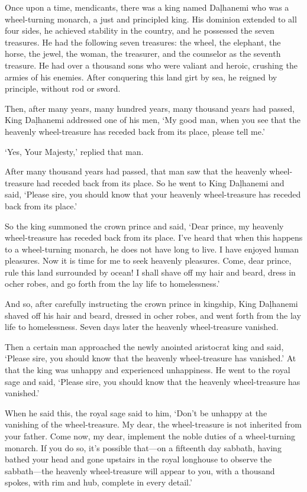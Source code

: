 \documentclass[12pt,openany]{book}%
\begin{document}
Once upon a time, mendicants, there was a king named \textsanskrit{Daḷhanemi} who was a wheel-turning monarch, a just and principled king. His dominion extended to all four sides, he achieved stability in the country, and he possessed the seven treasures. He had the following seven treasures: the wheel, the elephant, the horse, the jewel, the woman, the treasurer, and the counselor as the seventh treasure. He had over a thousand sons who were valiant and heroic, crushing the armies of his enemies. After conquering this land girt by sea, he reigned by principle, without rod or sword. 

Then, after many years, many hundred years, many thousand years had passed, King \textsanskrit{Daḷhanemi} addressed one of his men, ‘My good man, when you see that the heavenly wheel-treasure has receded back from its place, please tell me.’ 

‘Yes, Your Majesty,’ replied that man. 

After many thousand years had passed, that man saw that the heavenly wheel-treasure had receded back from its place. So he went to King \textsanskrit{Daḷhanemi} and said, ‘Please sire, you should know that your heavenly wheel-treasure has receded back from its place.’ 

So the king summoned the crown prince and said, ‘Dear prince, my heavenly wheel-treasure has receded back from its place. I’ve heard that when this happens to a wheel-turning monarch, he does not have long to live. I have enjoyed human pleasures. Now it is time for me to seek heavenly pleasures. Come, dear prince, rule this land surrounded by ocean! I shall shave off my hair and beard, dress in ocher robes, and go forth from the lay life to homelessness.’ 

And so, after carefully instructing the crown prince in kingship, King \textsanskrit{Daḷhanemi} shaved off his hair and beard, dressed in ocher robes, and went forth from the lay life to homelessness. Seven days later the heavenly wheel-treasure vanished. 

Then a certain man approached the newly anointed aristocrat king and said, ‘Please sire, you should know that the heavenly wheel-treasure has vanished.’ At that the king was unhappy and experienced unhappiness. He went to the royal sage and said, ‘Please sire, you should know that the heavenly wheel-treasure has vanished.’ 

When he said this, the royal sage said to him, ‘Don’t be unhappy at the vanishing of the wheel-treasure. My dear, the wheel-treasure is not inherited from your father. Come now, my dear, implement the noble duties of a wheel-turning monarch. If you do so, it’s possible that—on a fifteenth day sabbath, having bathed your head and gone upstairs in the royal longhouse to observe the sabbath—the heavenly wheel-treasure will appear to you, with a thousand spokes, with rim and hub, complete in every detail.’ 
\end{document}
